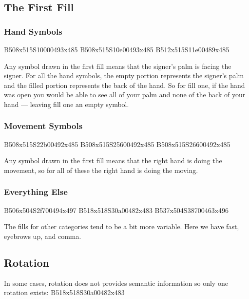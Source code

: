 \documentclass{article}
\begin{document}
\subsection{The First Fill}

\subsubsection{Hand Symbols}

\begin{center}
B508x515S10000493x485 B508x515S10e00493x485 B512x515S11e00489x485
\end{center}

Any symbol drawn in the first fill means that the signer's palm is facing the signer.
For all the hand symbols, the empty portion represents the signer's palm and the filled portion represents the back of the hand.
So for fill one, if the hand was open you would be able to see all of your palm and none of the back of your hand --- leaving fill one an empty symbol.

\subsubsection{Movement Symbols}

\begin{center}
B508x515S22b00492x485 B508x515S25600492x485 B508x515S26600492x485
\end{center}

Any symbol drawn in the first fill means that the right hand is doing the movement, so for all of these the right hand is doing the moving.

\subsubsection{Everything Else}

\begin{center}
B506x504S2f700494x497 B518x518S30a00482x483 B537x504S38700463x496
\end{center}

The fills for other categories tend to be a bit more variable.
Here we have fast, eyebrows up, and comma.

\subsection{Rotation}

In some cases, rotation does not provides semantic information so only one rotation exists:
B518x518S30a00482x483
\end{document}
